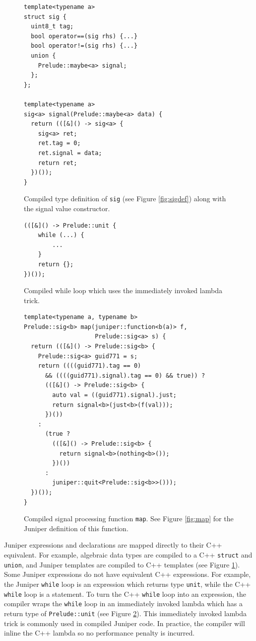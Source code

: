 \documentclass{sigplanconf}
\begin{document}
\begin{figure}
\begin{verbatim}
template<typename a>
struct sig {
  uint8_t tag;
  bool operator==(sig rhs) {...}
  bool operator!=(sig rhs) {...}
  union {
    Prelude::maybe<a> signal;
  };
};

template<typename a>
sig<a> signal(Prelude::maybe<a> data) {
  return (([&]() -> sig<a> {
    sig<a> ret;
    ret.tag = 0;
    ret.signal = data;
    return ret;
  })());
}
\end{verbatim}
\caption{Compiled type definition of \texttt{sig} (see Figure \ref{fig:sigdef}) along with the signal value constructor.}
\label{fig:compiledsigdef}
\end{figure}

\begin{figure}
\begin{verbatim}
(([&]() -> Prelude::unit {
    while (...) {
        ...
    }
    return {};
})());
\end{verbatim}
\caption{Compiled while loop which uses the immediately invoked lambda trick.}
\label{fig:compiledwhile}
\end{figure}

\begin{figure}
\begin{verbatim}
template<typename a, typename b>
Prelude::sig<b> map(juniper::function<b(a)> f, 
                    Prelude::sig<a> s) {
  return (([&]() -> Prelude::sig<b> {
    Prelude::sig<a> guid771 = s;
    return ((((guid771).tag == 0)
      && ((((guid771).signal).tag == 0) && true)) ? 
      (([&]() -> Prelude::sig<b> {
        auto val = ((guid771).signal).just;
        return signal<b>(just<b>(f(val)));
      })())
    :
      (true ? 
        (([&]() -> Prelude::sig<b> {
          return signal<b>(nothing<b>());
        })())
      :
        juniper::quit<Prelude::sig<b>>()));
  })());
}
\end{verbatim}
\caption{Compiled signal processing function \texttt{map}. See Figure \ref{fig:map} for the Juniper definition of this function.}
\label{fig:compiledmap}
\end{figure}

Juniper expressions and declarations are mapped directly to their C++ equivalent. For example, algebraic data types are compiled to a C++ \texttt{struct} and \texttt{union}, and Juniper templates are compiled to C++ templates (see Figure \ref{fig:compiledsigdef}). Some Juniper expressions do not have equivalent C++ expressions. For example, the Juniper \texttt{while} loop is an expression which returns type \texttt{unit}, while the C++ \texttt{while} loop is a statement. To turn the C++ \texttt{while} loop into an expression, the compiler wraps the \texttt{while} loop in an immediately invoked lambda which has a return type of \texttt{Prelude::unit} (see Figure \ref{fig:compiledwhile}). This immediately invoked lambda trick is commonly used in compiled Juniper code. In practice, the compiler will inline the C++ lambda so no performance penalty is incurred.
\end{document}

